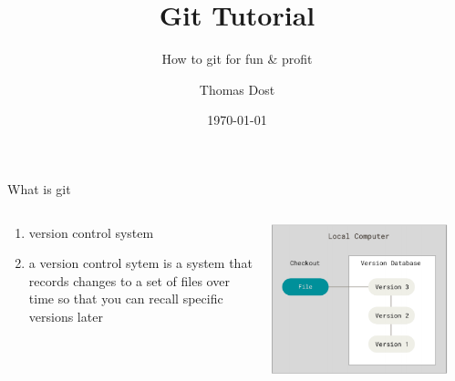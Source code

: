 \documentclass{beamer}
\title{Git Tutorial}
\subtitle{How to git for fun \& profit }
\author{Thomas Dost}
\date{\today}
\begin{document}
\begin{frame}
\titlepage
\end{frame}

\begin{frame}[fragile,t]{What is git}
  \begin{columns}
    \begin{column}{0.5\textwidth}
      \begin{enumerate}
        \item version control system
        \item a version control sytem is a system that records changes to a set of files over time so that you can recall specific versions later
      \end{enumerate}
    \end{column}

    \begin{column}{0.5\textwidth}
      \includegraphics[width=0.9\textwidth,height=0.6\textheight]{screenshots/2022-03-27-110459_634x543_scrot.png}
    \end{column}
  \end{columns}
\end{frame}
\end{document}
